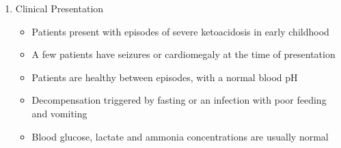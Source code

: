\documentclass{scrartcl}
\begin{document}
\begin{enumerate}
\item Clinical Presentation
\label{sec:org4faff77}
\begin{itemize}
\item Patients present with episodes of severe ketoacidosis in early childhood
\item A few patients have seizures or cardiomegaly at the time of presentation
\item Patients are healthy between episodes, with a normal blood pH
\item Decompensation triggered by fasting or an infection with poor
feeding and vomiting
\item Blood glucose, lactate and ammonia concentrations are usually normal
\end{itemize}


\end{enumerate}
\end{document}
